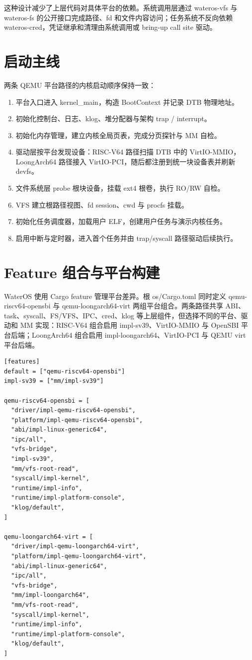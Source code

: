 \documentclass[12pt,openany,oneside,AutoFakeBold=true]{ctexbook}
\newcommand{\code}[1]{\textnormal{\rmfamily #1}}
\begin{document}
这种设计减少了上层代码对具体平台的依赖。系统调用层通过 \code{wateros-vfs} 与 \code{wateros-fs} 的公开接口完成路径、fd 和文件内容访问；任务系统不反向依赖 \code{wateros-cred}，凭证继承和清理由系统调用或 bring-up call site 驱动。

\section{启动主线}

两条 QEMU 平台路径的内核启动顺序保持一致：

\begin{enumerate}
  \item 平台入口进入 \code{kernel\_main}，构造 \code{BootContext} 并记录 DTB 物理地址。
  \item 初始化控制台、日志、klog、堆分配器与架构 trap / interrupt。
  \item 初始化内存管理，建立内核全局页表，完成分页探针与 MM 自检。
  \item 驱动层按平台发现设备：RISC-V64 路径扫描 DTB 中的 VirtIO-MMIO，LoongArch64 路径接入 VirtIO-PCI，随后都注册到统一块设备表并刷新 devfs。
  \item 文件系统层 probe 根块设备，挂载 ext4 根卷，执行 RO/RW 自检。
  \item VFS 建立根路径视图、fd session、cwd 与 procfs 挂载。
  \item 初始化任务调度器，加载用户 ELF，创建用户任务与演示内核任务。
  \item 启用中断与定时器，进入首个任务并由 trap/syscall 路径驱动后续执行。
\end{enumerate}

\section{Feature 组合与平台构建}

WaterOS 使用 Cargo feature 管理平台差异。根 \code{os/Cargo.toml} 同时定义 \code{qemu-riscv64-opensbi} 与 \code{qemu-loongarch64-virt} 两组平台组合。两条路径共享 ABI、task、syscall、FS/VFS、IPC、cred、klog 等上层组件，但选择不同的平台、驱动和 MM 实现：RISC-V64 组合启用 \code{impl-sv39}、VirtIO-MMIO 与 OpenSBI 平台后端；LoongArch64 组合启用 \code{impl-loongarch64}、VirtIO-PCI 与 QEMU virt 平台后端。

\begin{lstlisting}
[features]
default = ["qemu-riscv64-opensbi"]
impl-sv39 = ["mm/impl-sv39"]

qemu-riscv64-opensbi = [
  "driver/impl-qemu-riscv64-opensbi",
  "platform/impl-qemu-riscv64-opensbi",
  "abi/impl-linux-generic64",
  "ipc/all",
  "vfs-bridge",
  "impl-sv39",
  "mm/vfs-root-read",
  "syscall/impl-kernel",
  "runtime/impl-info",
  "runtime/impl-platform-console",
  "klog/default",
]

qemu-loongarch64-virt = [
  "driver/impl-qemu-loongarch64-virt",
  "platform/impl-qemu-loongarch64-virt",
  "abi/impl-linux-generic64",
  "ipc/all",
  "vfs-bridge",
  "mm/impl-loongarch64",
  "mm/vfs-root-read",
  "syscall/impl-kernel",
  "runtime/impl-info",
  "runtime/impl-platform-console",
  "klog/default",
]
\end{lstlisting}
\end{document}
